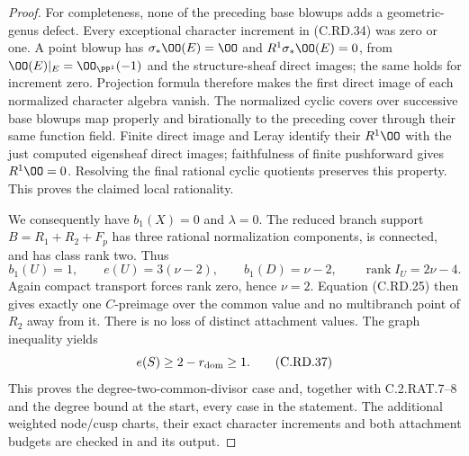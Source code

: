 \begin{proof}
For completeness, none of the preceding
base blowups adds a geometric-genus defect.
Every exceptional character increment in
(C.RD.34) was zero or one. A point blowup
has $\sigma_*\OO(E)=\OO$ and
$R^1\sigma_*\OO(E)=0$, from
$\OO(E)|_E=\OO_{\PP^1}(-1)$ and the
structure-sheaf direct images; the same
holds for increment zero. Projection formula
therefore makes the first direct image of
each normalized character algebra vanish.
The normalized cyclic covers over successive
base blowups map properly and birationally
to the preceding cover through their same
function field. Finite direct image and
Leray identify their $R^1\OO$ with the
just computed eigensheaf direct images;
faithfulness of finite pushforward gives
$R^1\OO=0$. Resolving the final rational
cyclic quotients preserves this property.
This proves the claimed local rationality.

We consequently have $b_1(X)=0$ and
$\lambda=0$. The reduced branch support
$B=R_1+R_2+F_p$ has three rational
normalization components, is connected,
and has class rank two. Thus
\[
 b_1(U)=1,\qquad e(U)=3(\nu-2),\qquad
 b_1(D)=\nu-2,\qquad
          \operatorname{rank}I_U=2\nu-4.
\tag{C.RD.36}
\]
Again compact transport forces rank zero,
hence $\nu=2$.
Equation (C.RD.25) then gives exactly one
$C$-preimage over the common value and no
multibranch point of $R_2$ away from it.
There is no loss of distinct attachment
values. The graph inequality yields
\[
                    e(S)\ge2-r_{\rm dom}\ge1.
\tag{C.RD.37}
\]
This proves the degree-two-common-divisor
case and, together with C.2.RAT.7--8 and
the degree bound at the start, every case
in the statement.
The additional weighted node/cusp charts,
their exact character increments and both
attachment budgets are checked in
 and its output.
\end{proof}
